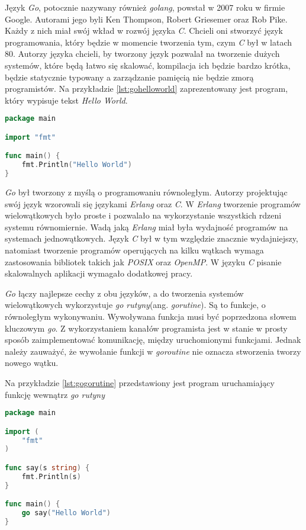 Język \textsl{Go}, potocznie nazywany również \textsl{golang}, powstał w 2007 roku w firmie Google. Autorami jego byli Ken Thompson, Robert Griesemer oraz Rob Pike\cite{programmingingo}. Każdy z nich miał swój wkład w rozwój języka \textsl{C}. Chcieli oni stworzyć język programowania, który będzie w momencie tworzenia tym, czym \textsl{C} był w latach 80. Autorzy języka chcieli, by tworzony język pozwalał na tworzenie dużych systemów, które będą łatwo się skalować, kompilacja ich będzie bardzo krótka, będzie statycznie typowany a zarządzanie pamięcią nie będzie zmorą programistów. Na przykładzie \ref{lst:gohelloworld} zaprezentowany jest program, który wypisuje tekst \textsl{Hello World}.
\begin{lstlisting}[language=Go, caption={Przykład programu w języku Go}, label={lst:gohelloworld}]
package main

import "fmt"

func main() {
	fmt.Println("Hello World")
}
\end{lstlisting}

\textsl{Go} był tworzony z myślą o programowaniu równoległym. Autorzy projektując swój język wzorowali się językami \textsl{Erlang} oraz \textsl{C}. W \textsl{Erlang} tworzenie programów wielowątkowych było proste i pozwalało na wykorzystanie wszystkich rdzeni systemu równomiernie. Wadą jaką \textsl{Erlang} miał była wydajność programów na systemach jednowątkowych. Język \textsl{C} był w tym względzie znacznie wydajniejszy, natomiast tworzenie programów operujących na kilku wątkach wymaga zastosowania bibliotek takich jak \textsl{POSIX} oraz \textsl{OpenMP}. W języku \textsl{C} pisanie skalowalnych aplikacji wymagało dodatkowej pracy.

\textsl{Go} łączy najlepsze cechy z obu języków, a do tworzenia systemów wielowątkowych wykorzystuje \textsl{go rutyny}(ang. \textsl{gorutine})\cite{gophrasebook}. Są to funkcje, o równoległym wykonywaniu. Wywoływana funkcja musi być poprzedzona słowem kluczowym \textsl{go}. Z wykorzystaniem kanałów programista jest w stanie w prosty sposób zaimplementować komunikację, między uruchomionymi funkcjami. Jednak należy zauważyć, że wywołanie funkcji w \textsl{goroutine} nie oznacza stworzenia tworzy nowego wątku. 

Na przykładzie \ref{lst:gogorutine} przedstawiony jest program uruchamiający funkcję wewnątrz \textsl{go rutyny}
\begin{lstlisting}[language=Go, caption={Przykładowy program w Go wykorzystujący goroutine}, label={lst:gogorutine}]
package main

import (
	"fmt"
)

func say(s string) {
	fmt.Println(s)
}

func main() {
	go say("Hello World")
}
\end{lstlisting}



